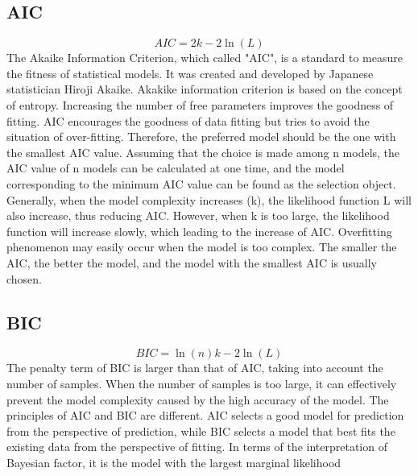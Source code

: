 \documentclass[11pt]{article}
\begin{document}
	\subsection{AIC}
	\begin{equation}
    	AIC = 2k - 2 \ln(L)
  	\end{equation}
    The Akaike Information Criterion, which called "AIC", is a standard to measure the fitness of statistical models. It was created and developed by Japanese statistician Hiroji Akaike. Akakike information criterion is based on the concept of entropy. Increasing the number of free parameters improves the goodness of fitting. AIC encourages the goodness of data fitting but tries to avoid the situation of over-fitting. Therefore, the preferred model should be the one with the smallest AIC value. Assuming that the choice is made among n models, the AIC value of n models can be calculated at one time, and the model corresponding to the minimum AIC value can be found as the selection object. Generally, when the model complexity increases (k), the likelihood function L will also increase, thus reducing AIC. However, when k is too large, the likelihood function will increase slowly, which leading to the increase of AIC. Overfitting phenomenon may easily occur when the model is too complex. The smaller the AIC, the better the model, and the model with the smallest AIC is usually chosen.
	\subsection{BIC}
    \begin{equation}
    	BIC = \ln(n)k - 2\ln(L) 
  	\end{equation}
    The penalty term of BIC is larger than that of AIC, taking into account the number of samples. When the number of samples is too large, it can effectively prevent the model complexity caused by the high accuracy of the model. The principles of AIC and BIC are different. AIC selects a good model for prediction from the perspective of prediction, while BIC selects a model that best fits the existing data from the perspective of fitting. In terms of the interpretation of Bayesian factor, it is the model with the largest marginal likelihood
\end{document}
